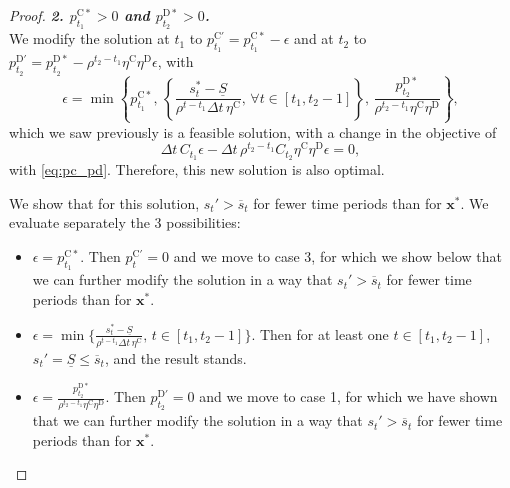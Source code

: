\documentclass[10pt,a4paper]{amsart}
\newcommand{\up}[1]{^{\mathrm{#1}}}
\begin{document}
\begin{proof}
    \textit{\textbf{2. $p_{t_1}\up{C*}>0$ and $p_{t_2}\up{D*}>0$.}} \\
    We modify the solution at $t_1$ to ${p}\up{C'}_{t_1}={p}\up{C*}_{t_1}-{\epsilon}$ and at $t_2$ to ${p}\up{D'}_{t_2}={p}\up{D*}_{t_2}- \rho^{t_2 - t_1} \eta\up{C} \eta\up{D} \epsilon$, with
    \begin{equation} \label{eq:epsilon_2}
        \epsilon = \min \left\{ {p}\up{C*}_{t_1}, \, \left\{\frac{{s}_t^* - \underline{S}}{\rho^{t - t_1} \Delta t \, \eta\up{C}}, \, \forall t \in [t_1,t_2-1] \right\}, \, \frac{{p}\up{D*}_{t_2}}{\rho^{t_2 - t_1} \eta\up{C} \eta\up{D}} \right\},
    \end{equation}
    which we saw previously is a feasible solution, with a change in the objective of
    \begin{equation}
       \Delta t \, C_{t_1} \epsilon - \Delta t \, \rho^{t_2 - t_1} C_{t_2} \eta\up{C} \eta\up{D} \epsilon = 0,
    \end{equation}
    with \eqref{eq:pc_pd}. Therefore, this new solution is also optimal.
    
    We show that for this solution, $s_t' > \overline{s}_t$ for fewer time periods than for $\mathbf{x}^*$.
    We evaluate separately the 3 possibilities:
    \begin{itemize}
        \item ${\epsilon} = {p}\up{C*}_{t_1}$. Then $p\up{C'}_t = 0$ and we move to case 3, for which we show below that we can further modify the solution in a way that $s_t' > \overline{s}_t$ for fewer time periods than for $\mathbf{x}^*$.
        \item ${\epsilon} = \min \{ \frac{s_t^* - \underline{S}}{\rho^{t - t_1} \Delta t \, \eta\up{C}}, \, t \in [t_1, t_2-1] \}$. Then for at least one $t \in [t_1, t_2-1]$, $s_t'= \underline{S} \leq \overline{s}_t$, and the result stands.
        \item ${\epsilon} = \frac{{p}\up{D*}_{t_2}}{\rho^{t_2 - t_1} \eta\up{C} \eta\up{D}}$. Then ${p}\up{D'}_{t_2} = 0$ and we move to case 1, for which we have shown that we can further modify the solution in a way that $s_t' > \overline{s}_t$ for fewer time periods than for $\mathbf{x}^*$. 
    \end{itemize}


\end{proof}
\end{document}
